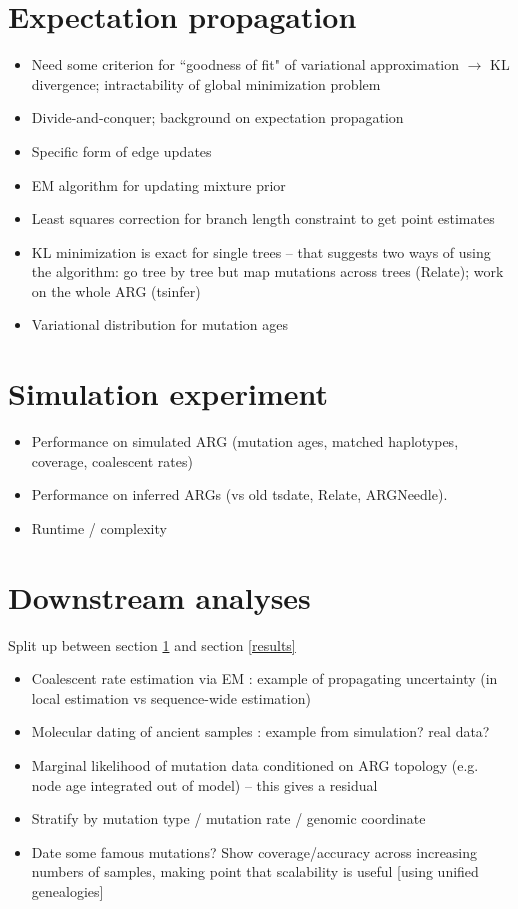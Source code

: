 \documentclass{article}
\begin{document}
\section{Expectation propagation}
\label{methods}
\begin{itemize}
\item Need some criterion for ``goodness of fit" of variational approximation $\rightarrow$ KL divergence; intractability of global minimization problem
\item Divide-and-conquer; background on expectation propagation
\item Specific form of edge updates
\item EM algorithm for updating mixture prior
\item Least squares correction for branch length constraint to get point estimates
\item KL minimization is exact for single trees -- that suggests two ways of using the algorithm: go tree by tree but map mutations across trees (Relate); work on the whole ARG (tsinfer)
\item Variational distribution for mutation ages
\end{itemize}


\section{Simulation experiment}
\begin{itemize}
\item Performance on simulated ARG (mutation ages, matched haplotypes, coverage, coalescent rates)
\item Performance on inferred ARGs (vs old tsdate, Relate, ARGNeedle).
\item Runtime / complexity
\end{itemize}


\section{Downstream analyses}
Split up between section \ref{methods} and section \ref{results}
\begin{itemize}
\item Coalescent rate estimation via EM : example of propagating uncertainty (in local estimation vs sequence-wide estimation)
\item Molecular dating of ancient samples : example from simulation? real data?
\item Marginal likelihood of mutation data conditioned on ARG topology (e.g. node age integrated out of model) -- this gives a residual
\item Stratify by mutation type / mutation rate / genomic coordinate
\item Date some famous mutations? Show coverage/accuracy across increasing numbers of samples, making point that scalability is useful [using unified genealogies]
\end{itemize}
\end{document}
